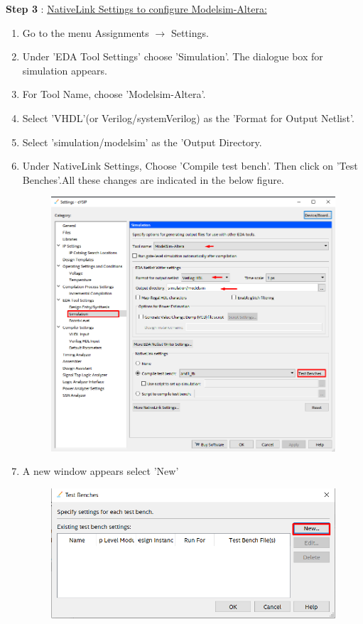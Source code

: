 \documentclass[12pt,singleside,a4paper]{article}
\begin{document}
\noindent \textbf{Step 3} : \underline{ NativeLink Settings to configure Modelsim-Altera:}
\begin{enumerate}
    \item Go to the menu Assignments $\rightarrow$ Settings.
    \item Under 'EDA Tool Settings' choose 'Simulation'. The dialogue box for
           simulation appears.
    \item For Tool Name, choose 'Modelsim-Altera'.
    \item Select 'VHDL'(or Verilog/systemVerilog) as the 'Format for Output Netlist'.
    \item Select 'simulation/modelsim' as the 'Output Directory.
    \item Under NativeLink Settings, Choose 'Compile test bench'. Then click on       'Test Benches'.All these changes are indicated in the below figure.
        \begin{figure}[H]
            \centering
            \includegraphics[scale=0.6]{nativelink/nativelink_2.png}
        \end{figure}
    \item A new window appears select 'New'
        \begin{figure}[H]
            \centering
            \includegraphics[scale=0.7]{nativelink/nativelink_3.png}

\end{figure}
\end{enumerate}
\end{document}
